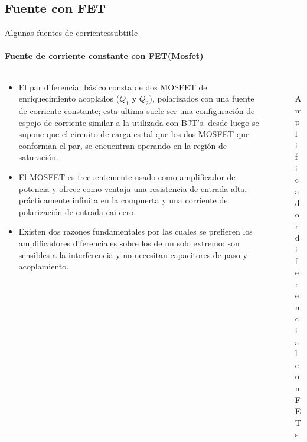 \documentclass[aspectratio=169, 8pt]{beamer}
\begin{document}
\subsection{Fuente con FET}
\begin{frame}{Algunas fuentes de corrientes}{subtitle}
\framesubtitle{Fuente de corriente constante con FET(Mosfet)}
\begin{columns}
	\begin{column}{0.5\textwidth}
		\begin{itemize}
			\item El par diferencial básico consta de dos MOSFET de enriquecimiento acoplados ($Q_1$ y $Q_2$), polarizados con una fuente de corriente constante; esta ultima suele ser una configuración de espejo de corriente similar a la utilizada con BJT’s. desde luego se supone que el circuito de carga es tal que los dos MOSFET que conforman el par, se encuentran operando en la región de saturación.
			\item El MOSFET es frecuentemente usado como amplificador de potencia y ofrece como ventaja una resistencia de entrada alta, prácticamente infinita en la compuerta y una corriente de polarización de entrada cai cero.
			\item Existen dos razones fundamentales por las cuales se prefieren los amplificadores diferenciales sobre los de un solo extremo: son sensibles a la interferencia y no necesitan capacitores de paso y acoplamiento.
		\end{itemize}
	\end{column}

	\begin{column}{0.4\textwidth}
		\begin{figure}[!ht]
			\centering
			\includegraphics[width=5cm]{IMAGENES/image5.png}
			\caption{Amplificador diferencial con FETs}
		\end{figure}
	\end{column}
\end{columns}
\end{frame}
\end{document}

